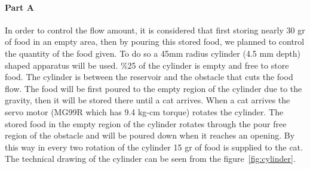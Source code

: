 \paragraph{Part A}
In order to control the flow amount, it is considered that first storing nearly 30 gr of food in an empty area, then by pouring this stored food, we planned to control the quantity of the food given. To do so a 45mm radius cylinder (4.5 mm depth) shaped apparatus will be used. \%25 of the cylinder is empty and free to store food. The cylinder is between the reservoir and the obstacle that cuts the food flow. The food will be first poured to the empty region of the cylinder due to the gravity, then it will be stored there until a cat arrives. When a cat arrives the servo motor (MG99R which has 9.4 kg-cm torque) rotates the cylinder. The stored food in the empty region of the cylinder rotates through the pour free region of the obstacle and will be poured down when it reaches an opening. By this way in every two rotation of the cylinder 15 gr of food is supplied to the cat. The technical drawing of the cylinder can be seen from the figure~\ref{fig:cylinder}.

